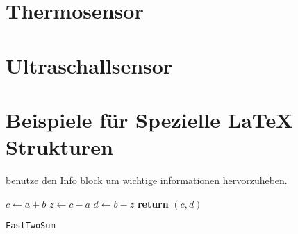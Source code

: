 \documentclass{article}
\begin{document}
\newpage
\section{Thermosensor} %

\newpage
\section{Ultraschallsensor} %


\newpage
\section{Beispiele für Spezielle LaTeX Strukturen}

\begin{info} %
	benutze den Info block um wichtige informationen hervorzuheben.
\end{info}


\begin{center}
	\begin{minipage}{0.5\linewidth} %
		\begin{algorithm}[H]
			\medskip
			$c \leftarrow a + b$ \;
			$z \leftarrow c - a$ \;
			$d \leftarrow b - z$ \;
			{\bf return} $(c,d)$ \;
			\caption{\texttt{FastTwoSum}} %
			\label{alg:fastTwoSum}   %
		\end{algorithm}
	\end{minipage}
\end{center}

\end{document}
